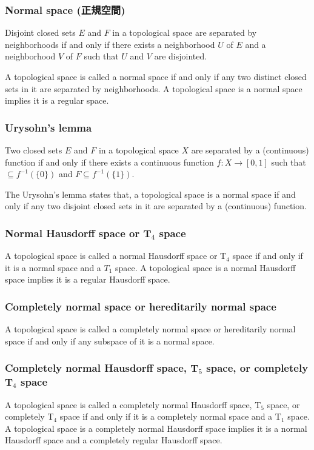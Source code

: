 \documentclass[a4paper,12pt]{article}
\begin{document}
\subsubsection{Normal space (正規空間)}
Disjoint closed sets $E$ and $F$ in a topological space are separated by neighborhoods if and only if there exists a neighborhood $U$ of $E$ and a neighborhood $V$ of $F$ such that $U$ and $V$ are disjointed.

A topological space is called a normal space if and only if any two distinct closed sets in it are separated by neighborhoods. A topological space is a normal space implies it is a regular space.
\subsubsection{Urysohn's lemma}
Two closed sets $E$ and $F$ in a topological space $X$ are separated by a (continuous) function if and only if there exists a continuous function $f\colon X\to [0,1]$ such that $\subseteq f^{-1}(\{0\})$ and $F\subseteq f^{-1}(\{1\})$.

The Urysohn's lemma states that, a topological space is a normal space if and only if any two disjoint closed sets in it are separated by a (continuous) function.
\subsubsection{Normal Hausdorff space or T$_4$ space}
A topological space is called a normal Hausdorff space or T$_4$ space if and only if it is a normal space and a $T_1$ space. A topological space is a normal Hausdorff space implies it is a regular Hausdorff space.
\subsubsection{Completely normal space or hereditarily normal space}
A topological space is called a completely normal space or hereditarily normal space if and only if any subspace of it is a normal space.
\subsubsection{Completely normal Hausdorff space, T$_5$ space, or completely T$_4$ space}
A topological space is called a completely normal Hausdorff space, T$_5$ space, or completely T$_4$ space if and only if it is a completely normal space and a T$_1$ space. A topological space is a completely normal Hausdorff space implies it is a normal Hausdorff space and a completely regular Hausdorff space.
\end{document}
